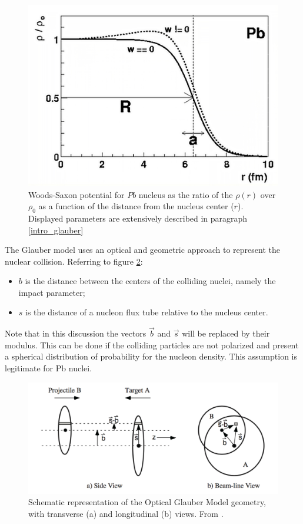 \begin{figure}[!h]
\begin{center}
\includegraphics[width=0.7\linewidth]{Chapters/Analysis/Figs/woods-saxon.pdf}
\caption{Woods-Saxon potential for $Pb$ nucleus as the ratio of the $\rho(r)$ over $\rho_0$ as a function of the distance from the nucleus center ($r$).
Displayed parameters are extensively described in paragraph \ref{intro_glauber}}
\label{fig:WoodsSaxon}
\end{center}
\end{figure}

The Glauber model uses an optical and geometric approach to represent the nuclear collision.
Referring to figure \ref{fig:GlauberSide}:
\begin{itemize}
\item $b$ is the distance between the centers of the colliding nuclei, namely the impact parameter;
\item $s$ is the distance of a nucleon flux tube relative to the nucleus center.
\end{itemize}
Note that in this discussion the vectors $\vec{b}$ and $\vec{s}$ will be replaced by their modulus.
This can be done if the colliding particles are not polarized and present a spherical distribution of probability for the nucleon density.
This assumption is legitimate for Pb nuclei.

\begin{figure}[!h]
\begin{center}
\includegraphics[width=0.85\linewidth]{Chapters/Analysis/Figs/glauber-side.pdf}
\caption{Schematic representation of the Optical Glauber Model geometry, with transverse (a) and longitudinal (b) views. From \cite{Miller:2007ri}.}
\label{fig:GlauberSide}
\end{center}
\end{figure}

